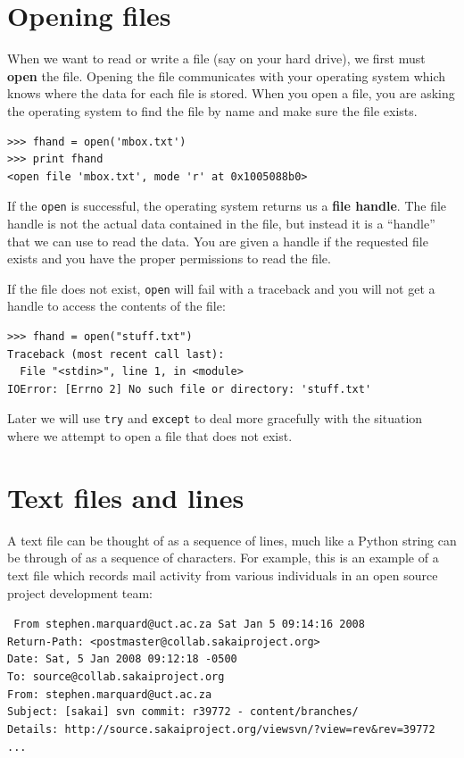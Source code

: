 \documentclass[10pt]{book}
\begin{document}
\section{Opening files}

When we want to read or write a file (say on your hard drive), we first
must {\bf open} the file.  Opening the file communicates with your operating
system which knows where the data for each file is stored.  When you open
a file, you are asking the operating system to find the file by name
and make sure the file exists.

\beforeverb
\begin{verbatim}
>>> fhand = open('mbox.txt')
>>> print fhand
<open file 'mbox.txt', mode 'r' at 0x1005088b0>
\end{verbatim}
\afterverb
%
If the {\tt open} is successful, the operating system returns us a 
{\bf file handle}.  The file handle is not the actual data contained
in the file, but instead it is a ``handle'' that we can use to 
read the data.   You are given a handle if the requested file
exists and you have the proper permissions to read the file.

If the file does not exist, {\tt open} will fail with a traceback and you 
will not get a handle to access the contents of the file:

\beforeverb
\begin{verbatim}
>>> fhand = open("stuff.txt")
Traceback (most recent call last):
  File "<stdin>", line 1, in <module>
IOError: [Errno 2] No such file or directory: 'stuff.txt'
\end{verbatim}
\afterverb
%
Later we will use {\tt try} and {\tt except} to deal more gracefully
with the situation where we attempt to open a file that does 
not exist.

\section{Text files and lines}

A text file can be thought of as a sequence of lines, much like a Python
string can be through of as a sequence of characters.  For example, this
is an example of a text file which records mail activity from various
individuals in an open source project development team:

{\tt
From stephen.marquard@uct.ac.za Sat Jan  5 09:14:16 2008\\
Return-Path: <postmaster@collab.sakaiproject.org>\\
Date: Sat, 5 Jan 2008 09:12:18 -0500\\
To: source@collab.sakaiproject.org\\
From: stephen.marquard@uct.ac.za\\
Subject: [sakai] svn commit: r39772 - content/branches/\\
Details: http://source.sakaiproject.org/viewsvn/?view=rev\&rev=39772\\
...
}
\end{document}
